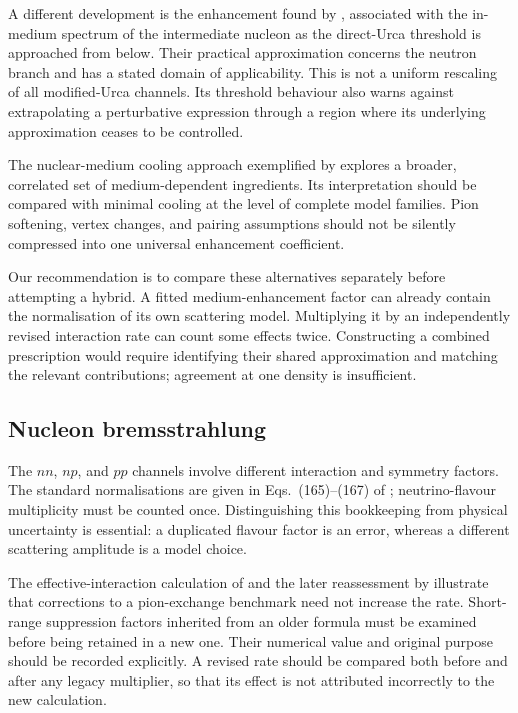 \documentclass{aa}
\begin{document}
A different development is the enhancement found by \citet{Shternin2018}, associated with the in-medium spectrum of the intermediate nucleon as the direct-Urca threshold is approached from below. Their practical approximation concerns the neutron branch and has a stated domain of applicability. This is not a uniform rescaling of all modified-Urca channels. Its threshold behaviour also warns against extrapolating a perturbative expression through a region where its underlying approximation ceases to be controlled.

The nuclear-medium cooling approach exemplified by \citet{Blaschke2004} explores a broader, correlated set of medium-dependent ingredients. Its interpretation should be compared with minimal cooling at the level of complete model families. Pion softening, vertex changes, and pairing assumptions should not be silently compressed into one universal enhancement coefficient.

Our recommendation is to compare these alternatives separately before attempting a hybrid. A fitted medium-enhancement factor can already contain the normalisation of its own scattering model. Multiplying it by an independently revised interaction rate can count some effects twice. Constructing a combined prescription would require identifying their shared approximation and matching the relevant contributions; agreement at one density is insufficient.

\subsection{Nucleon bremsstrahlung}
The $nn$, $np$, and $pp$ channels involve different interaction and symmetry factors. The standard normalisations are given in Eqs.~(165)--(167) of \citet{Yakovlev2001}; neutrino-flavour multiplicity must be counted once. Distinguishing this bookkeeping from physical uncertainty is essential: a duplicated flavour factor is an error, whereas a different scattering amplitude is a model choice.

The effective-interaction calculation of \citet{Schwenk2004} and the later reassessment by \citet{Bottaro2024} illustrate that corrections to a pion-exchange benchmark need not increase the rate. Short-range suppression factors inherited from an older formula must be examined before being retained in a new one. Their numerical value and original purpose should be recorded explicitly. A revised rate should be compared both before and after any legacy multiplier, so that its effect is not attributed incorrectly to the new calculation.
\end{document}
